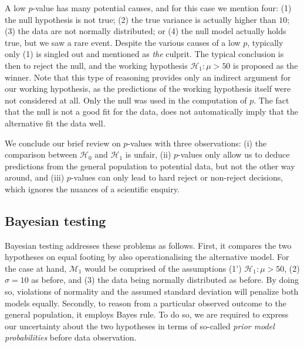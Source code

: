 \documentclass[english,,doc,floatsintext]{apa6}
\begin{document}
A low \(p\)-value has many potential causes, and for this case we mention four: (1) the null hypothesis is not true; (2) the true variance is actually higher than \(10\); (3) the data are not normally distributed; or (4) the null model actually holds true, but we saw a rare event. Despite the various causes of a low \(p\), typically only (1) is singled out and mentioned as \emph{the} culprit. The typical conclusion is then to reject the null, and the working hypothesis \(\mathcal{H}_{1} : \mu > 50\) is proposed as the winner. Note that this type of reasoning provides only an indirect argument for our working hypothesis, as the predictions of the working hypothesis itself were not considered at all. Only the null was used in the computation of \(p\). The fact that the null is not a good fit for the data, does not automatically imply that the alternative fit the data well.

We conclude our brief review on \(p\)-values with three observations: (i) the comparison between \(\mathcal{H}_{0}\) and \(\mathcal{H}_{1}\) is unfair, (ii) \(p\)-values only allow us to deduce predictions from the general population to potential data, but not the other way around, and (iii) \(p\)-values can only lead to hard reject or non-reject decisions, which ignores the nuances of a scientific enquiry.

\subsection{Bayesian testing}

Bayesian testing addresses these problems as follows. First, it compares the two hypotheses on equal footing by also operationalising the alternative model. For the case at hand, \(\mathcal{M}_{1}\) would be comprised of the assumptions (1') \(\mathcal{H}_{1}: \mu > 50\), (2) \(\sigma =10\) as before, and (3) the data being normally distributed as before. By doing so, violations of normality and the assumed standard deviation will penalize both models equally. Secondly, to reason from a particular observed outcome to the general population, it employs Bayes rule. To do so, we are required to express our uncertainty about the two hypotheses in terms of so-called \emph{prior model probabilities} before data observation.
\end{document}
